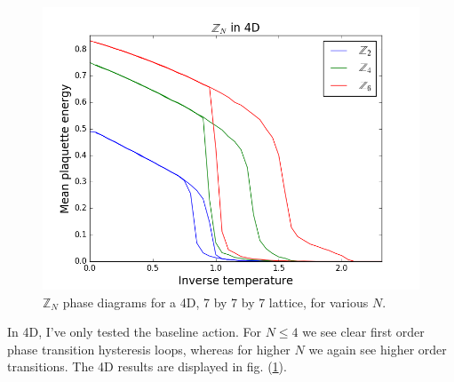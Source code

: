 \documentclass[9pt,twocolumn,twoside]{article}
\begin{document}
\begin{figure}[h!]
	\begin{centering}
	\includegraphics[width=\columnwidth]{zn,4d}
	\caption{$\mathbb{Z}_N$ phase diagrams for a 4D, 7 by 7 by 7 lattice, for various $N$.}
	\label{zn,4d}
	\end{centering}
\end{figure}

In 4D, I've only tested the baseline action.  For $N\leq 4$ we see clear first order phase transition hysteresis loops, whereas for higher $N$ we again see higher order transitions.  The 4D results are displayed in fig. (\ref{zn,4d}).  
\end{document}
